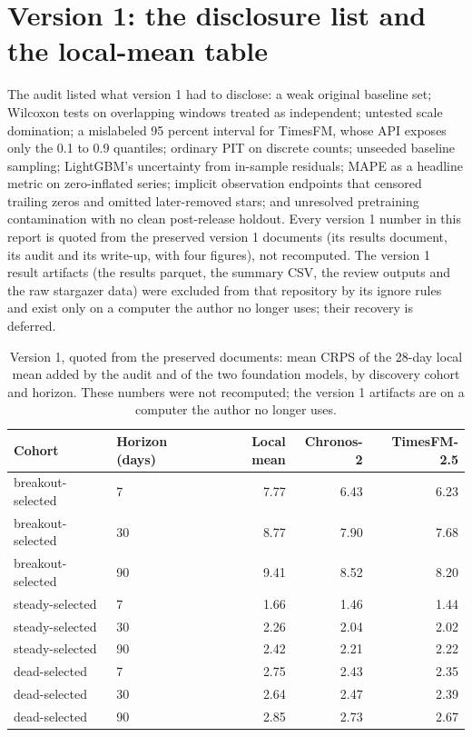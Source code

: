 \section{Version 1: the disclosure list and the local-mean table}
\label{app:v1}

The audit listed what version 1 had to disclose: a weak original baseline set; Wilcoxon tests on overlapping
windows treated as independent; untested scale domination; a mislabeled 95 percent interval for TimesFM,
whose API exposes only the 0.1 to 0.9 quantiles; ordinary PIT on discrete counts; unseeded baseline sampling;
LightGBM's uncertainty from in-sample residuals; MAPE as a headline metric on zero-inflated series; implicit
observation endpoints that censored trailing zeros and omitted later-removed stars; and unresolved
pretraining contamination with no clean post-release holdout. Every version 1 number in this report is
quoted from the preserved version 1 documents (its results document, its audit and its write-up, with four
figures), not recomputed. The version 1 result artifacts (the results parquet, the summary CSV, the review
outputs and the raw stargazer data) were excluded from that repository by its ignore rules and exist only on
a computer the author no longer uses; their recovery is deferred.

\begin{table}[h]
\centering\small
\caption{Version 1, quoted from the preserved documents: mean CRPS of the 28-day local mean added by the
audit and of the two foundation models, by discovery cohort and horizon. These numbers were not recomputed;
the version 1 artifacts are on a computer the author no longer uses.}
\label{tab:v1}
\begin{tabular}{llrrr}
\toprule
Cohort & Horizon (days) & Local mean & Chronos-2 & TimesFM-2.5 \\
\midrule
breakout-selected & 7 & 7.77 & 6.43 & 6.23 \\
breakout-selected & 30 & 8.77 & 7.90 & 7.68 \\
breakout-selected & 90 & 9.41 & 8.52 & 8.20 \\
steady-selected & 7 & 1.66 & 1.46 & 1.44 \\
steady-selected & 30 & 2.26 & 2.04 & 2.02 \\
steady-selected & 90 & 2.42 & 2.21 & 2.22 \\
dead-selected & 7 & 2.75 & 2.43 & 2.35 \\
dead-selected & 30 & 2.64 & 2.47 & 2.39 \\
dead-selected & 90 & 2.85 & 2.73 & 2.67 \\
\bottomrule
\end{tabular}
\end{table}
